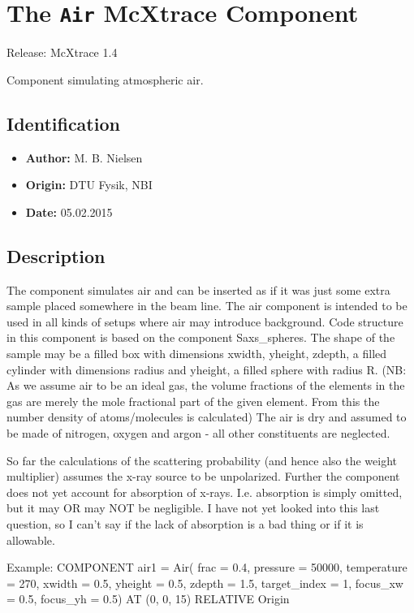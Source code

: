 \section{The \texttt{Air} McXtrace Component}
Release: McXtrace 1.4

Component simulating atmospheric air.

\subsection*{Identification}
\begin{itemize}
  \item \textbf{Author:} M. B. Nielsen
  \item \textbf{Origin:} DTU Fysik, NBI
  \item \textbf{Date:} 05.02.2015
\end{itemize}

\subsection*{Description}
The component simulates air and can be inserted as if it was just some extra sample placed somewhere in the beam line. The air component is intended to be used in all kinds of setups where air may introduce background. Code structure in this component is based on the component Saxs\_spheres. The shape of the sample may be a filled box with dimensions xwidth, yheight, zdepth, a filled cylinder with dimensions radius and yheight, a filled sphere with radius R. (NB: As we assume air to be an ideal gas, the volume fractions of the elements in the gas are merely the mole fractional part of the given element. From this the number density of atoms/molecules is calculated) The air is dry and assumed to be made of nitrogen, oxygen and argon - all other constituents are neglected.

So far the calculations of the scattering probability (and hence also the weight multiplier) assumes the x-ray source to be unpolarized. Further the component does not yet account for absorption of x-rays. I.e. absorption is simply omitted, but it may OR may NOT be negligible. I have not yet looked into this last question, so I can't say if the lack of absorption is a bad thing or if it is allowable.

Example: COMPONENT air1 = Air( frac = 0.4, pressure = 50000, temperature = 270, xwidth = 0.5, yheight = 0.5, zdepth = 1.5, target\_index = 1, focus\_xw = 0.5, focus\_yh = 0.5) AT (0, 0, 15) RELATIVE Origin

